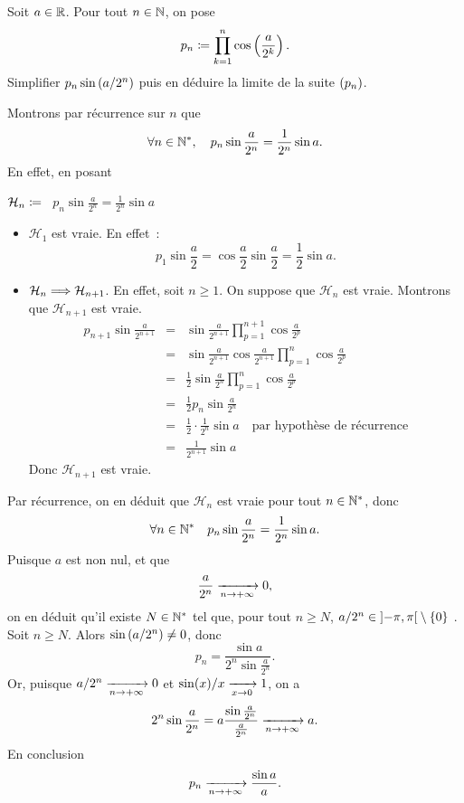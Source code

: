\documentclass{magnolia}
\begin{document}
\begin{exoUnique}
\exo Soit $a\in\mathbb{R}$. Pour tout $n\in\mathbb{N}$, on pose
  \[p_n\coloneqq\prod_{k=1}^n \cos\left(\frac{a}{2^k}\right).\]
  Simplifier $p_n \sin\left(a/2^n\right)$ puis en déduire la limite de la suite $\left(p_n\right)$.
  \begin{sol}
Montrons par récurrence sur $n$ que
  \[\forall n\in{\mathbb{N}^*} ,\quad p_n\sin\frac{a}{2^n}=\frac{1}{2^n}\sin a.\]
  En effet, en posant
  \begin{center}
  $\mathcal{H}_n \coloneqq$ \flqq\ $p_n\sin\frac{a}{2^n}=\frac{1}{2^n}\sin a$ \frqq
  \end{center}
  \begin{itemize}
  \item $\mathcal{H}_1$ est vraie. En effet~:
    \[p_1\sin\frac{a}{2}=\cos\frac{a}{2}\sin\frac{a}{2}=\frac{1}{2}\sin a.\]
  \item $\mathcal{H}_n \Longrightarrow \mathcal{H}_{n+1}$. En effet, soit $n\geq 1$.
    On suppose que $\mathcal{H}_n$ est vraie. Montrons que $\mathcal{H}_{n+1}$
    est vraie.
    \begin{eqnarray*}
    p_{n+1}\sin\frac{a}{2^{n+1}}
    &=& \sin\frac{a}{2^{n+1}} \prod_{p=1}^{n+1} \cos\frac{a}{2^p}\\
    &=& \sin\frac{a}{2^{n+1}} \cos\frac{a}{2^{n+1}}
        \prod_{p=1}^n \cos\frac{a}{2^p}\\
    &=& \frac{1}{2} \sin\frac{a}{2^n} \prod_{p=1}^n \cos\frac{a}{2^p}\\
    &=& \frac{1}{2} p_n \sin\frac{a}{2^n}\\
    &=& \frac{1}{2}\cdot \frac{1}{2^n} \sin a
        \quad\text{par hypothèse de récurrence}\\
    &=& \frac{1}{2^{n+1}} \sin a
    \end{eqnarray*}
    Donc $\mathcal{H}_{n+1}$ est vraie.
  \end{itemize}
  Par récurrence, on en déduit que $\mathcal{H}_{n}$ est vraie pour tout
  $n\in{\mathbb{N}^*}$, donc
  \[\forall n\in{\mathbb{N}^*} \quad p_n\sin\frac{a}{2^n}=\frac{1}{2^n}\sin a.\]
  Puisque $a$ est non nul, et que
  \[\frac{a}{2^n}\xrightarrow[n\rightarrow +\infty]{}0,\]
  on en déduit qu'il existe $N\in{\mathbb{N}^*}$ tel que, pour tout $n\geq N$, $a/2^n\in\left]-\pi,\pi\right[\setminus\left\{0\right\}$ . Soit $n\geq N$. Alors $\sin\left(a/2^n\right)\neq 0$, donc
  \[p_n=\frac{\sin a}{2^n\sin\frac{a}{2^n}}.\]
  Or, puisque $a/2^n \xrightarrow[n\rightarrow +\infty]{} 0$ et $\sin(x)/x \xrightarrow[x\rightarrow 0]{} 1$,
  on a
  \[2^n\sin\frac{a}{2^n}=a\frac{\sin\frac{a}{2^n}}{\frac{a}{2^n}}
    \xrightarrow[n\rightarrow +\infty]{} a.\]
  En conclusion
  \[p_n\xrightarrow[n\rightarrow +\infty]{} \frac{\sin a}{a}.\]
  \end{sol}
\end{exoUnique}
\end{document}
